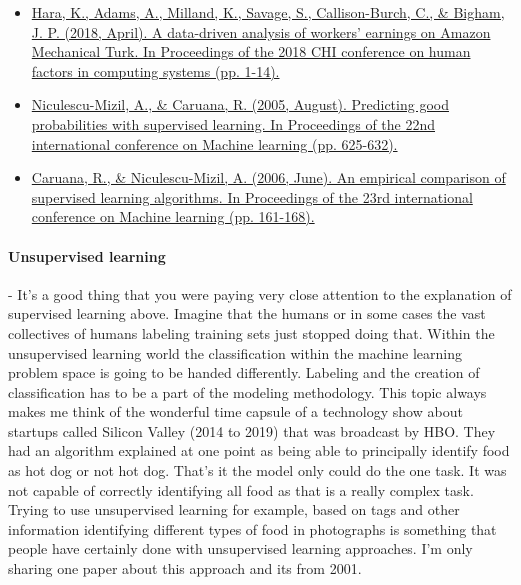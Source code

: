\documentclass{article}
\begin{document}
\begin{itemize}
\item \href{https://arxiv.org/pdf/1712.05796.pdf}{Hara, K., Adams, A., Milland, K., Savage, S., Callison-Burch, C., \& Bigham, J. P. (2018, April). A data-driven analysis of workers' earnings on Amazon Mechanical Turk. In Proceedings of the 2018 CHI conference on human factors in computing systems (pp. 1-14).} \cite{hara2018data}
\item \href{https://citeseerx.ist.psu.edu/viewdoc/download?doi=10.1.1.60.7135&rep=rep1&type=pdf}{Niculescu-Mizil, A., \& Caruana, R. (2005, August). Predicting good probabilities with supervised learning. In Proceedings of the 22nd international conference on Machine learning (pp. 625-632).} \cite{niculescu2005predicting}
\item \href{http://www.cs.cornell.edu/~alexn/papers/empirical.icml06.pdf}{Caruana, R., \& Niculescu-Mizil, A. (2006, June). An empirical comparison of supervised learning algorithms. In Proceedings of the 23rd international conference on Machine learning (pp. 161-168).} \cite{caruana2006empirical}
\end{itemize}

\paragraph{Unsupervised learning} - It’s a good thing that you were paying very close attention to the explanation of supervised learning above. Imagine that the humans or in some cases the vast collectives of humans labeling training sets just stopped doing that. Within the unsupervised learning world the classification within the machine learning problem space is going to be handed differently. Labeling and the creation of classification has to be a part of the modeling methodology. This topic always makes me think of the wonderful time capsule of a technology show about startups called Silicon Valley (2014 to 2019) that was broadcast by HBO. They had an algorithm explained at one point as being able to principally identify food as hot dog or not hot dog. That’s it the model only could do the one task. It was not capable of correctly identifying all food as that is a really complex task. Trying to use unsupervised learning for example, based on tags and other information identifying different types of food in photographs is something that people have certainly done with unsupervised learning approaches. I’m only sharing one paper about this approach and its from 2001. 
\end{document}
